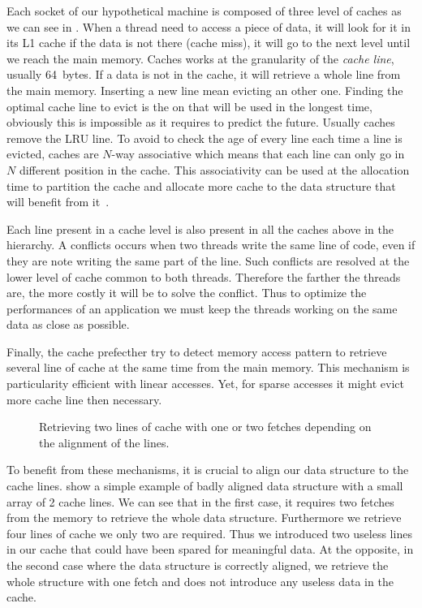Each socket of our hypothetical machine is composed of three level of caches as we can see in .
When a thread need to access a piece of data, it will look for it in its L1 cache if the data is not there (cache miss), it will go to the next level until we reach the main memory.
Caches works at the granularity of the \emph{cache line}, usually \SI{64}{bytes}.
If a data is not in the cache, it will retrieve a whole line from the main memory.
Inserting a new line mean evicting an other one.
Finding the optimal cache line to evict is the on that will be used in the longest time, obviously this is impossible as it requires to predict the future.
Usually caches remove the \acrfull{LRU} line.
To avoid to check the age of every line each time a line is evicted, caches are $N$-way associative which means that each line can only go in $N$ different position in the cache.
This associativity can be used at the allocation time to partition the cache and allocate more cache to the data structure that will benefit from it~\cite{Perarnau11Controlling}.

Each line present in a cache level is also present in all the caches above in the hierarchy.
A conflicts occurs when two threads write the same line of code, even if they are note writing the same part of the line.
Such conflicts are resolved at the lower level of cache common to both threads.
Therefore the farther the threads are, the more costly it will be to solve the conflict.
Thus to optimize the performances of an application we must keep the threads working on the same data as close as possible.


Finally, the cache prefecther try to detect memory access pattern to retrieve several line of cache at the same time from the main memory.
This mechanism is particularity efficient with linear accesses.
Yet, for sparse accesses it might evict more cache line then necessary.

\begin{figure}[htb]
    \centering
    
    \caption[Example of Bad alignment]{Retrieving two lines of cache with one or two fetches depending on the alignment of the lines.}
    \label{fig:bad-align}
\end{figure}

To benefit from these mechanisms, it is crucial to align our data structure to the cache lines.
 show a simple example of badly aligned data structure with a small array of 2 cache lines.
We can see that in the first case, it requires two fetches from the memory to retrieve the whole data structure.
Furthermore we retrieve four lines of cache we only two are required.
Thus we introduced two useless lines in our cache that could have been spared for meaningful data.
At the opposite, in the second case where the data structure is correctly aligned, we retrieve the whole structure with one fetch and does not introduce any useless data in the cache.

